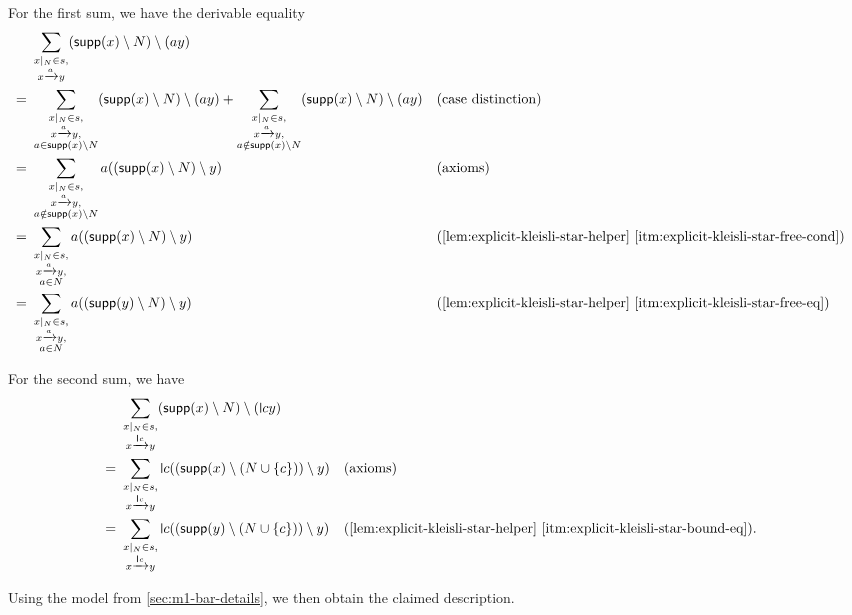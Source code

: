 \documentclass[a4paper,UKenglish,cleveref,thm-restate,numberwithinsect,final]{lipics-v2021}
\newif\iffullversion
\newcommand{\supp}{\mathsf{supp}}
\theoremstyle{plain}
\newcommand{\midmid}{\hspace{0.2ex}{\rule[-0.1ex]{0.6pt}{1.65ex}}\hspace{0.2ex}}
\newcommand{\scriptmidmid}{\hspace{0.2ex}{\rule[-0.1ex]{0.6pt}{1.1ex}}\hspace{0.2ex}}
\newcommand{\newletter}[1]{{\midmid}#1}
\newcommand{\scriptnew}[1]{{\scriptmidmid}#1}
\numberwithin{equation}{section}
\newcommand{\+}[1]{\mathcal{#1}\xspace}
\theoremstyle{definition}
\begin{document}
For the first sum, we have the derivable equality
\begin{align*}
  &\sum\limits_{\substack{x|_N \in s, \\ x \xrightarrow{a} y}} (\supp(x) \setminus N) \setminus (ay) \\
  =~&\sum\limits_{\substack{x|_N \in s, \\ x \xrightarrow{a} y, \\ a \in \supp(x) \setminus N}} (\supp(x) \setminus N) \setminus (ay) + \sum\limits_{\substack{x|_N \in s, \\ x \xrightarrow{a} y, \\ a \notin \supp(x) \setminus N}} (\supp(x) \setminus N) \setminus (ay) && \text{(case distinction)} \\
  =~&\sum\limits_{\substack{x|_N \in s, \\ x \xrightarrow{a} y, \\ a \notin \supp(x) \setminus N}} a((\supp(x) \setminus N) \setminus y) && \text{(axioms)} \\
  =~&\sum\limits_{\substack{x|_N \in s, \\ x \xrightarrow{a} y, \\ a \in N}} a((\supp(x) \setminus N) \setminus y) && \text{(\cref{lem:explicit-kleisli-star-helper} \eqref{itm:explicit-kleisli-star-free-cond})} \\
  =~&\sum\limits_{\substack{x|_N \in s, \\ x \xrightarrow{a} y, \\ a \in N}} a((\supp(y) \setminus N) \setminus y) && \text{(\cref{lem:explicit-kleisli-star-helper} \eqref{itm:explicit-kleisli-star-free-eq})} \\
\end{align*}

For the second sum, we have
\begin{align*}
  &\sum\limits_{\substack{x|_N \in s, \\ x \xrightarrow{\scriptnew{c}} y}} (\supp(x) \setminus N) \setminus (\newletter{c}y) \\
  =~&\sum\limits_{\substack{x|_N \in s, \\ x \xrightarrow{\scriptnew{c}} y}} \newletter{c}((\supp(x) \setminus (N \cup \{c\})) \setminus y) && \text{(axioms)} \\
  =~&\sum\limits_{\substack{x|_N \in s, \\ x \xrightarrow{\scriptnew{c}} y}} \newletter{c}((\supp(y) \setminus (N \cup \{c\})) \setminus y) && \text{(\cref{lem:explicit-kleisli-star-helper} \eqref{itm:explicit-kleisli-star-bound-eq})}.
\end{align*}

Using the model from \cref{sec:m1-bar-details}, we then obtain the claimed description.

\fi %
\end{document}
